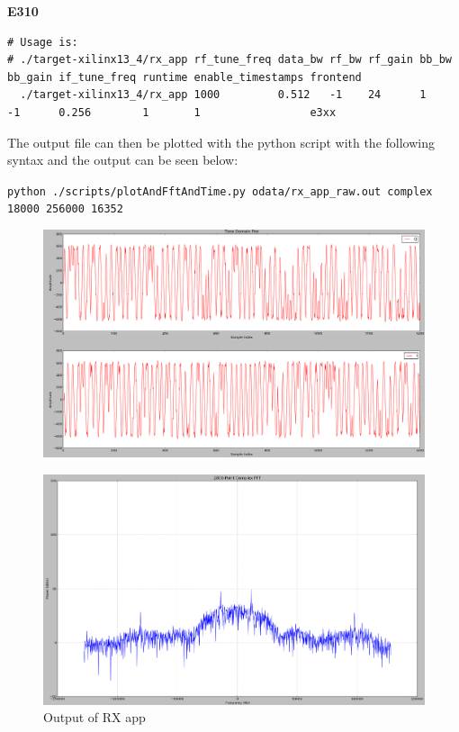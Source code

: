 \noindent\textbf{E310}
\scriptsize
\noindent
\begin{verbatim}
# Usage is:
# ./target-xilinx13_4/rx_app rf_tune_freq data_bw rf_bw rf_gain bb_bw bb_gain if_tune_freq runtime enable_timestamps frontend
  ./target-xilinx13_4/rx_app 1000         0.512   -1    24      1     -1      0.256        1       1                 e3xx
\end{verbatim}
\small
\par\medskip
\noindent The output file can then be plotted with the python script with the following syntax and the output can be seen below:\par\medskip
\noindent\texttt{python ./scripts/plotAndFftAndTime.py odata/rx\_app\_raw.out complex 18000 256000 16352}\par
	\begin{figure}[h]
	 	\centering
		\includegraphics[scale=.2]{rx_app_iq_plot}
		\label{fig:rx_app_iq_plot}
	\end{figure}
	\begin{figure}[h]
	 	\centering
		\includegraphics[scale=.2]{rx_app_fft_plot}
		\caption{Output of RX app}
		\label{fig:rx_app_fft_plot}
	\end{figure}
